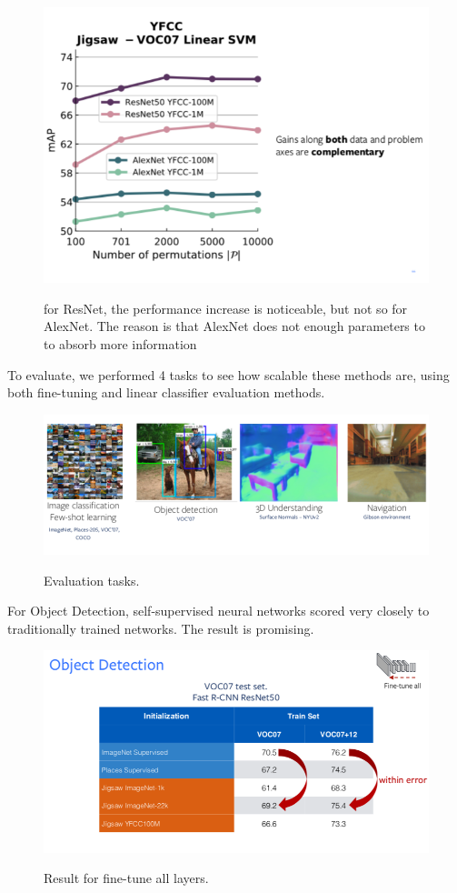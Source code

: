 \begin{figure}[H]
\centering
\includegraphics[width=0.8\linewidth]{lectures/14-b/graphics/combined.png}
\label{fig:combined}
\caption{for ResNet, the performance increase is noticeable, but not so for AlexNet. The reason is that AlexNet does not enough parameters to to absorb more information}
\end{figure}

To evaluate, we performed 4 tasks to see how scalable these methods are, using both fine-tuning and linear classifier evaluation methods.

\begin{figure}[H]
\centering
\includegraphics[width=0.8\linewidth]{lectures/14-b/graphics/evaluation.png}
\label{fig:evaluation}
\caption{Evaluation tasks.}
\end{figure}

For Object Detection, self-supervised neural networks scored very closely to traditionally trained networks. The result is promising.


\begin{figure}[H]
\centering
\includegraphics[width=0.8\linewidth]{lectures/14-b/graphics/od.png}
\label{fig:od}
\caption{Result for fine-tune all layers.}
\end{figure}

